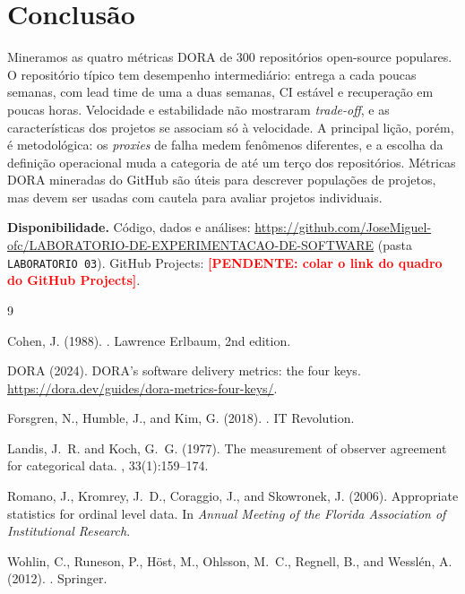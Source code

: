 \documentclass[12pt]{article}
\newcommand{\pendente}[1]{\textcolor{red}{\textbf{[PENDENTE: #1]}}}
\begin{document}
\section{Conclusão}

Mineramos as quatro métricas DORA de 300 repositórios open-source populares. O
repositório típico tem desempenho intermediário: entrega a cada poucas semanas, com
lead time de uma a duas semanas, CI estável e recuperação em poucas horas. Velocidade
e estabilidade não mostraram \textit{trade-off}, e as características dos projetos se
associam só à velocidade. A principal lição, porém, é metodológica: os
\textit{proxies} de falha medem fenômenos diferentes, e a escolha da definição
operacional muda a categoria de até um terço dos repositórios. Métricas DORA mineradas
do GitHub são úteis para descrever populações de projetos, mas devem ser usadas com
cautela para avaliar projetos individuais.

\textbf{Disponibilidade.} Código, dados e análises:
\url{https://github.com/JoseMiguel-ofc/LABORATORIO-DE-EXPERIMENTACAO-DE-SOFTWARE}
(pasta \texttt{LABORATORIO 03}). GitHub Projects: \pendente{colar o link do quadro do
GitHub Projects}.

\begin{thebibliography}{9}

Cohen, J. (1988).
.
\newblock Lawrence Erlbaum, 2nd edition.

DORA (2024).
\newblock DORA's software delivery metrics: the four keys.
\newblock \url{https://dora.dev/guides/dora-metrics-four-keys/}.

Forsgren, N., Humble, J., and Kim, G. (2018).
.
\newblock IT Revolution.

Landis, J.~R. and Koch, G.~G. (1977).
\newblock The measurement of observer agreement for categorical data.
, 33(1):159--174.

Romano, J., Kromrey, J.~D., Coraggio, J., and Skowronek, J. (2006).
\newblock Appropriate statistics for ordinal level data.
\newblock In {\em Annual Meeting of the Florida Association of Institutional Research}.

Wohlin, C., Runeson, P., Höst, M., Ohlsson, M.~C., Regnell, B., and Wesslén, A. (2012).
.
\newblock Springer.

\end{thebibliography}
\end{document}
